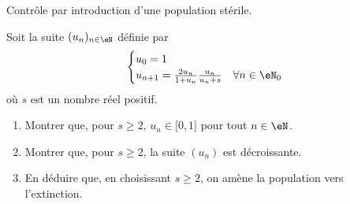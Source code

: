 
\begin{exercice}\label{exoTD3-0010}

	Contrôle par introduction d'une population stérile.

	Soit la suite $(u_n)_{n\in\eN}$ définie par
	\begin{equation}
		\begin{cases}
			u_0=1	&\\
			u_{n+1}=\frac{ 2u_n }{ 1+u_n }\frac{ u_n }{ u_n+s }	&	\text{$\forall n\in\eN_0$}
		\end{cases}
	\end{equation}
	où $s$ est un nombre réel positif.
	\begin{enumerate}
		\item
			Montrer que, pour $s\geq 2$, $u_n\in\mathopen[ 0 , 1 \mathclose]$ pour tout $n\in\eN$.
		\item
			Montrer que,  pour $s\geq 2$, la suite $(u_n)$ est décroissante.
		\item
			En déduire que, en choisissant $s\geq 2$, on amène la population vers l'extinction.

	\end{enumerate}

\end{exercice}
